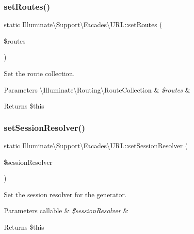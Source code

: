 \subsubsection{\texorpdfstring{set\+Routes()}{setRoutes()}}
{\footnotesize\ttfamily static Illuminate\textbackslash{}\+Support\textbackslash{}\+Facades\textbackslash{}\+U\+R\+L\+::set\+Routes (\begin{DoxyParamCaption}\item[{}]{\$routes }\end{DoxyParamCaption})\hspace{0.3cm}{\ttfamily [static]}}

Set the route collection.


\begin{DoxyParams}[1]{Parameters}
\textbackslash{}\+Illuminate\textbackslash{}\+Routing\textbackslash{}\+Route\+Collection & {\em \$routes} & \\
\hline
\end{DoxyParams}
\begin{DoxyReturn}{Returns}
\$this 
\end{DoxyReturn}
\mbox{\label{class_illuminate_1_1_support_1_1_facades_1_1_u_r_l_a2ed355860bdc0c3ef7c14f9e25e3ca0c}} 
\subsubsection{\texorpdfstring{set\+Session\+Resolver()}{setSessionResolver()}}
{\footnotesize\ttfamily static Illuminate\textbackslash{}\+Support\textbackslash{}\+Facades\textbackslash{}\+U\+R\+L\+::set\+Session\+Resolver (\begin{DoxyParamCaption}\item[{}]{\$session\+Resolver }\end{DoxyParamCaption})\hspace{0.3cm}{\ttfamily [static]}}

Set the session resolver for the generator.


\begin{DoxyParams}[1]{Parameters}
callable & {\em \$session\+Resolver} & \\
\hline
\end{DoxyParams}
\begin{DoxyReturn}{Returns}
\$this 
\end{DoxyReturn}
\mbox{\label{class_illuminate_1_1_support_1_1_facades_1_1_u_r_l_ae2859402af7949f436e3c7c16e433328}} 
